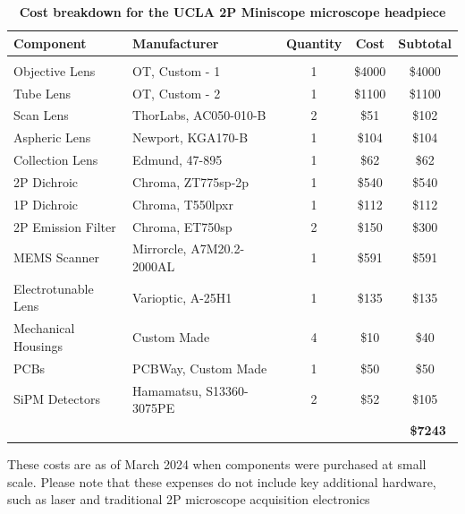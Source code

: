 \documentclass [PhD] {UCLAthesis}
\begin{document}
\begin{table}
    \centering
    \begin{tabular}{llccc}
      \textbf{Component}   & \textbf{Manufacturer} & \textbf{Quantity} & \textbf{Cost} & \textbf{Subtotal}\\
      \hline
      \\
        Objective Lens & OT, Custom - 1 & 1 & \$4000 & \$4000\\
        Tube Lens & OT, Custom - 2 & 1 & \$1100 & \$1100\\
        Scan Lens & ThorLabs, AC050-010-B & 2 & \$51 & \$102\\
        Aspheric Lens & Newport, KGA170-B & 1 & \$104 & \$104\\
        Collection Lens & Edmund, 47-895 & 1 & \$62 & \$62\\
        2P Dichroic & Chroma, ZT775sp-2p & 1 & \$540 & \$540\\
        1P Dichroic & Chroma, T550lpxr & 1 & \$112 & \$112\\
        2P Emission Filter & Chroma, ET750sp & 2 & \$150 & \$300\\
        MEMS Scanner & Mirrorcle, A7M20.2-2000AL & 1 & \$591 & \$591\\
        Electrotunable Lens & Varioptic, A-25H1 & 1 & \$135 & \$135\\
        Mechanical Housings & Custom Made & 4 & \$10 & \$40\\
        PCBs & PCBWay, Custom Made & 1 & \$50 & \$50\\
        SiPM Detectors & Hamamatsu, S13360-3075PE & 2 & \$52 & \$105\\
         &  &  &  & \ \textbf{\$7243}\\

    \end{tabular}
    \caption{\textbf{Cost breakdown for the UCLA 2P Miniscope microscope headpiece}}
    \raggedright
    These costs are as of March 2024 when components were purchased at small scale. Please note that these expenses do not include key additional hardware, such as laser and traditional 2P microscope acquisition electronics
    \label{tab:cost_table}
\end{table}
\end{document}
